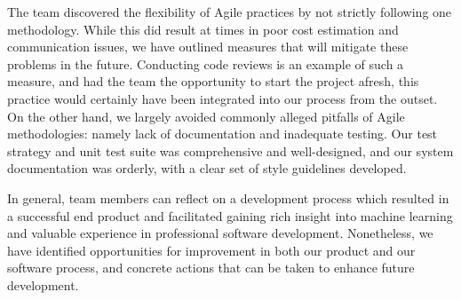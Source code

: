 \documentclass{l3proj}
\begin{document}
The team discovered the flexibility of Agile practices by not strictly following one methodology. While this did result at times in poor cost estimation and communication issues, we have outlined measures that will mitigate these problems in the future. Conducting code reviews is an example of such a measure, and had the team the opportunity to start the project afresh, this practice would certainly have been integrated into our process from the outset. On the other hand, we largely avoided commonly alleged pitfalls of Agile methodologies: namely lack of documentation and inadequate testing. Our test strategy and unit test suite was comprehensive and well-designed, and our system documentation was orderly, with a clear set of style guidelines developed.

In general, team members can reflect on a development process which resulted in a successful end product and facilitated gaining rich insight into machine learning and valuable experience in professional software development. Nonetheless, we have identified opportunities for improvement in both our product and our software process, and concrete actions that can be taken to enhance future development.



\end{document}
